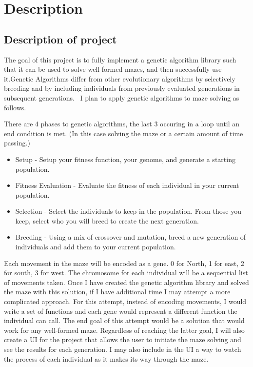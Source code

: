 \documentclass[letterpaper, 12pt]{article}
\begin{document}
\section{Description}
  \subsection{Description of project}
  The goal of this project is to fully implement a genetic algorithm library such that it can be used to solve well-formed mazes, and then successfully use it.Genetic Algorithms differ from other evolutionary algorithms by selectively breeding and by including individuals from previously evaluated generations in subsequent generations.~\cite{paul} I plan to apply genetic algorithms to maze solving as follows.

  There are 4 phases to genetic algorithms, the last 3 occuring in a loop until an end condition is met. (In this case solving the maze or a certain amount of time passing.)
  \begin{itemize}
		  \item Setup - Setup your fitness function, your genome, and generate a starting population.
		  \item Fitness Evaluation - Evaluate the fitness of each individual in your current population.
		  \item Selection - Select the individuals to keep in the population.  From those you keep, select who you will breed to create the next generation.
		  \item Breeding - Using a mix of crossover and mutation, breed a new generation of individuals and add them to your current population.
\end{itemize}
  Each movement in the maze will be encoded as a gene. 0 for North, 1 for east, 2 for south, 3 for west. The chromosome for each individual will be a sequential list of movements taken. Once I have created the genetic algorithm library and solved the maze with this solution, if I have additional time I may attempt a more complicated approach. For this attempt, instead of encoding movements, I would write a set of functions and each gene would represent a different function the individual can call.  The end goal of this attempt would be a solution that would work for any well-formed maze. Regardless of reaching the latter goal, I will also create a UI for the project that allows the user to initiate the maze solving and see the results for each generation.  I may also include in the UI a way to watch the process of each individual as it makes its way through the maze.
\end{document}
